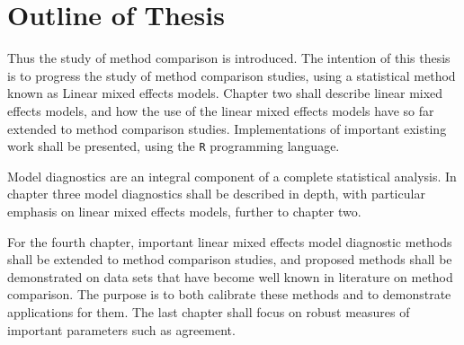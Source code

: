 \documentclass[Chap2main.tex]{subfiles}
\begin{document}
\section{Outline of Thesis}
Thus the study of method comparison is introduced. The intention of this thesis is to progress the
study of method comparison studies, using a statistical method known as Linear mixed effects models.
Chapter two shall describe linear mixed effects models, and how the use of the linear mixed
effects models have so far extended to method comparison studies. Implementations of important existing work shall be presented, using the \texttt{R} programming language.

Model diagnostics are an integral component of a complete statistical analysis.
In chapter three model diagnostics shall be described in depth, with particular
emphasis on linear mixed effects models, further to chapter two.

For the fourth chapter, important linear mixed effects model diagnostic methods shall be extended to method comparison studies, and proposed methods shall be demonstrated on data sets that have become well known in literature on method comparison. The purpose is to both calibrate these methods and to demonstrate applications for them.
The last chapter shall focus on robust measures of important parameters such as agreement.


\end{document}
